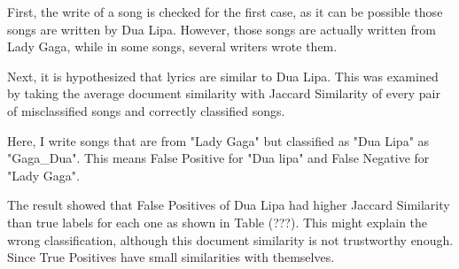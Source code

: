 \documentclass[a4paper,11pt]{article}
\begin{document}
First, the write of a song is checked for the first case, as it can be possible those songs are written by Dua Lipa.
However, those songs are actually written from Lady Gaga, while in some songs, several writers wrote them.

Next, it is hypothesized that lyrics are similar to Dua Lipa.
This was examined by taking the average document similarity with Jaccard Similarity
of every pair of misclassified songs and correctly classified songs.

Here, I write songs that are from "Lady Gaga" but classified as "Dua Lipa" as "Gaga\_Dua".
This means False Positive for "Dua lipa" and False Negative for "Lady Gaga".

The result showed that False Positives of Dua Lipa had higher Jaccard Similarity than 
true labels for each one as shown in Table (???).
This might explain the wrong classification, although this document similarity is not trustworthy enough.
Since True Positives have small similarities with themselves.
\end{document}
